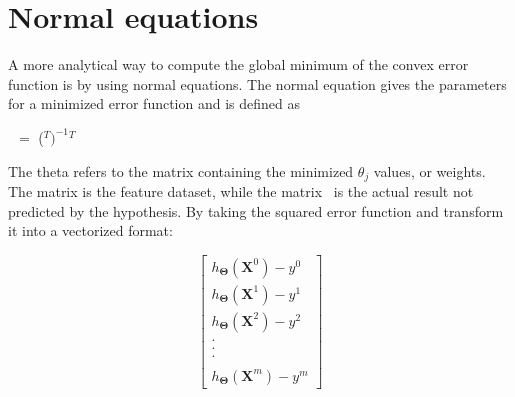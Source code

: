 \documentclass[a4paper,12pt]{article}
\begin{document}
\section{Normal equations}
A more analytical way to compute the global minimum of the convex error function is by using normal equations. The normal equation gives the parameters for a minimized error function and is defined as
\begin{center}
\boldmath{$\Theta $}\unboldmath \ $=$ (\unboldmath$^T$\unboldmath$)^{-1}$\unboldmath$^T$\unboldmath
\end{center}
The theta refers to the matrix containing the minimized \(\theta_j\) values, or weights. The matrix \unboldmath is the feature dataset, while the matrix \unboldmath \ is the actual result not predicted by the hypothesis. By taking the squared error function and transform it into a vectorized format:

\[\begin{bmatrix} h_{\boldsymbol{\Theta}} (\boldsymbol{X}^0) - y^0 \\ h_{\boldsymbol{\Theta}} (\boldsymbol{X}^1) - y^1 \\ h_{\boldsymbol{\Theta}} (\boldsymbol{X}^2) - y^2 \\ . \\ . \\ . \\  \\ h_{\boldsymbol{\Theta}} (\boldsymbol{X}^m) - y^m\end{bmatrix}\]
\end{document}
